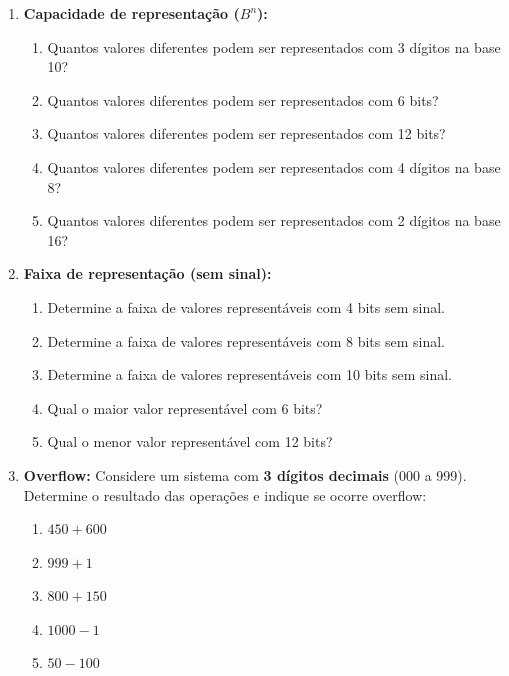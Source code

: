 
\begin{enumerate}

    \item \textbf{Capacidade de representação ($B^n$):}
          \begin{enumerate}
              \item Quantos valores diferentes podem ser representados com 3 dígitos na base 10?
              \item Quantos valores diferentes podem ser representados com 6 bits?
              \item Quantos valores diferentes podem ser representados com 12 bits?
              \item Quantos valores diferentes podem ser representados com 4 dígitos na base 8?
              \item Quantos valores diferentes podem ser representados com 2 dígitos na base 16?
          \end{enumerate}

    \item \textbf{Faixa de representação (sem sinal):}
          \begin{enumerate}
              \item Determine a faixa de valores representáveis com 4 bits sem sinal.
              \item Determine a faixa de valores representáveis com 8 bits sem sinal.
              \item Determine a faixa de valores representáveis com 10 bits sem sinal.
              \item Qual o maior valor representável com 6 bits?
              \item Qual o menor valor representável com 12 bits?
          \end{enumerate}

    \item \textbf{Overflow:}
          Considere um sistema com \textbf{3 dígitos decimais} (000 a 999). Determine o resultado das operações e indique se ocorre overflow:

          \begin{enumerate}
              \item $450 + 600$
              \item $999 + 1$
              \item $800 + 150$
              \item $1000 - 1$
              \item $50 - 100$
          \end{enumerate}


\end{enumerate}
